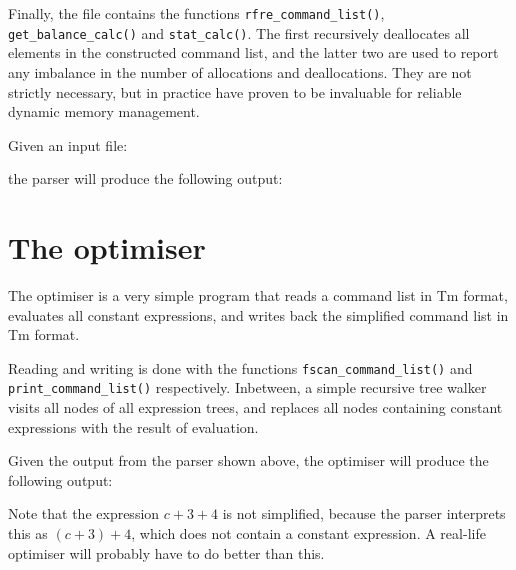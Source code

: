 \begin{sloppypar}
Finally, the file contains the functions \verb'rfre_command_list()',
\verb'get_balance_calc()' and \verb'stat_calc()'. The first recursively
deallocates all elements in the constructed command list, and the latter
two are used to report any imbalance in the number of allocations and
deallocations. They are not strictly necessary, but in practice have
proven to be invaluable for reliable dynamic memory management.
\end{sloppypar}
\par
Given an input file:
\begin{showfile}
\end{showfile}
the parser will produce the following output:
\begin{showfile}
\end{showfile}
\section{The optimiser}
The optimiser is a very simple program that reads a command list
in Tm format, evaluates all constant expressions, and writes back the
simplified command list in Tm format.
\begin{showfile}
\end{showfile}
\begin{sloppypar}
Reading and writing is done with the functions
\verb'fscan_command_list()' and \verb'print_command_list()'
respectively. Inbetween, a simple recursive tree walker visits all nodes
of all expression trees, and replaces all nodes containing constant
expressions with the result of evaluation.
\end{sloppypar}

Given the output from the parser shown above, the optimiser will produce
the following output:
\begin{showfile}
\end{showfile}
Note that the expression $c+3+4$ is not simplified, because the parser
interprets this as $(c+3)+4$, which does not contain a constant
expression. A real-life optimiser will probably have to do better
than this.
